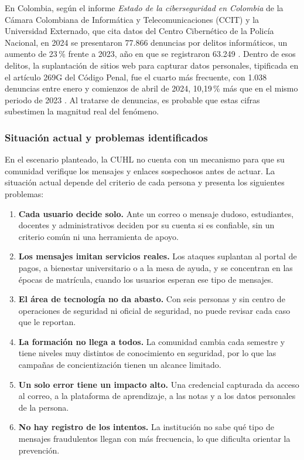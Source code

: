 \documentclass[journal,onecolumn,12pt,draftclsnofoot]{IEEEtran}
\begin{document}
En Colombia, según el informe \emph{Estado de la ciberseguridad en Colombia} de la Cámara Colombiana de Informática y Telecomunicaciones (CCIT) y la Universidad Externado, que cita datos del Centro Cibernético de la Policía Nacional, en 2024 se presentaron 77.866 denuncias por delitos informáticos, un aumento de 23\,\% frente a 2023, año en que se registraron 63.249 \cite{telesemana}. Dentro de esos delitos, la suplantación de sitios web para capturar datos personales, tipificada en el artículo 269G del Código Penal, fue el cuarto más frecuente, con 1.038 denuncias entre enero y comienzos de abril de 2024, 10,19\,\% más que en el mismo periodo de 2023 \cite{semana}. Al tratarse de denuncias, es probable que estas cifras subestimen la magnitud real del fenómeno.

\subsubsection{Situación actual y problemas identificados}

En el escenario planteado, la CUHL no cuenta con un mecanismo para que su comunidad verifique los mensajes y enlaces sospechosos antes de actuar. La situación actual depende del criterio de cada persona y presenta los siguientes problemas:

\begin{enumerate}
  \item \textbf{Cada usuario decide solo.} Ante un correo o mensaje dudoso, estudiantes, docentes y administrativos deciden por su cuenta si es confiable, sin un criterio común ni una herramienta de apoyo.
  \item \textbf{Los mensajes imitan servicios reales.} Los ataques suplantan al portal de pagos, a bienestar universitario o a la mesa de ayuda, y se concentran en las épocas de matrícula, cuando los usuarios esperan ese tipo de mensajes.
  \item \textbf{El área de tecnología no da abasto.} Con seis personas y sin centro de operaciones de seguridad ni oficial de seguridad, no puede revisar cada caso que le reportan.
  \item \textbf{La formación no llega a todos.} La comunidad cambia cada semestre y tiene niveles muy distintos de conocimiento en seguridad, por lo que las campañas de concientización tienen un alcance limitado.
  \item \textbf{Un solo error tiene un impacto alto.} Una credencial capturada da acceso al correo, a la plataforma de aprendizaje, a las notas y a los datos personales de la persona.
  \item \textbf{No hay registro de los intentos.} La institución no sabe qué tipo de mensajes fraudulentos llegan con más frecuencia, lo que dificulta orientar la prevención.
\end{enumerate}
\end{document}
